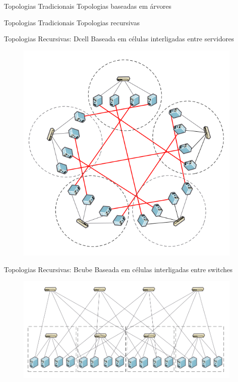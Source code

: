 \documentclass[aspectratio=169]{beamer}
\begin{document}
	\begin{frame} {Topologias Tradicionais}
		Topologias baseadas em árvores
	\end{frame}

	\begin{frame} {Topologias Tradicionais}
		Topologias recursivas
	\end{frame}

	\begin{frame} {Topologias Recursivas: Dcell}
		Baseada em células interligadas entre servidores
		\begin{figure}[ht]    
			\includegraphics[scale=0.3]{imagens/dcell.png}
			\label{fig:sample_figure}
		\end{figure}
	\end{frame}

	\begin{frame} {Topologias Recursivas: Bcube}
		Baseada em células interligadas entre switches
		\begin{figure}[ht]    
			\includegraphics[scale=0.3]{imagens/bcube.png}
			\label{fig:sample_figure}
		\end{figure}
	\end{frame}
\end{document}
